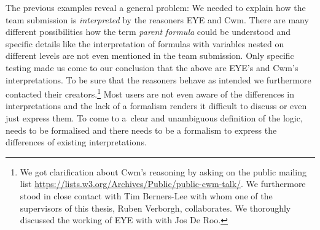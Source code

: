 The previous examples reveal a general problem: 
We needed to explain how the \wwwc team submission is \emph{interpreted} by the reasoners EYE and Cwm.  %
There are many different possibilities how the term \emph{parent formula} could be understood 
and specific details like the interpretation of formulas with variables nested on different levels are not even mentioned in the \wwwc team submission. 
Only
specific testing made us come to our conclusion that the above are EYE's and Cwm's interpretations. To be sure that the reasoners behave as intended we furthermore
contacted their creators.\footnote{We got clarification about Cwm's reasoning by asking on the public mailing list \url{https://lists.w3.org/Archives/Public/public-cwm-talk/}. 
We furthermore stood in close contact with Tim Berners-Lee with whom one of the supervisors of this thesis, Ruben Verborgh, collaborates.
We thoroughly discussed the working of EYE with with Jos De Roo.
}
Most users are not even aware of the differences in interpretations and the lack of a formalism renders it difficult to discuss or even just express them. %
To come to a~clear and unambiguous definition of the logic, 
\nthree needs to be formalised and there needs to be a formalism to express the differences of existing interpretations. 
% 
% 
% 
% 
% 
% 

